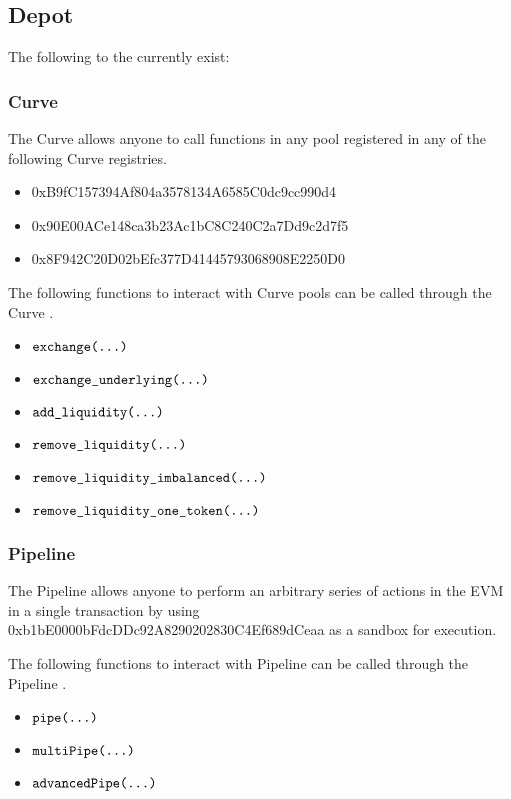 \documentclass[class=article, crop=false]{standalone}
\begin{document}
\subsection{Depot}
The following  to the  currently exist:

\subsubsection{Curve}
The Curve  allows anyone to call functions in any pool registered in any of the following Curve registries.
\begin{itemize}
    \item 0xB9fC157394Af804a3578134A6585C0dc9cc990d4
    \item 0x90E00ACe148ca3b23Ac1bC8C240C2a7Dd9c2d7f5
    \item 0x8F942C20D02bEfc377D41445793068908E2250D0
\end{itemize}

The following functions to interact with Curve pools can be called through the Curve .
\begin{itemize}
    \item $\texttt{exchange(...)}$
    \item $\texttt{exchange\_underlying(...)}$
    \item $\texttt{add\_liquidity(...)}$
    \item $\texttt{remove\_liquidity(...)}$
    \item $\texttt{remove\_liquidity\_imbalanced(...)}$
    \item $\texttt{remove\_liquidity\_one\_token(...)}$
\end{itemize}

\subsubsection{Pipeline}
The Pipeline  allows anyone to perform an arbitrary series of actions in the EVM in a single transaction by using 0xb1bE0000bFdcDDc92A8290202830C4Ef689dCeaa as a sandbox for execution.

The following functions to interact with Pipeline can be called through the Pipeline .
\begin{itemize}
    \item $\texttt{pipe(...)}$
    \item $\texttt{multiPipe(...)}$
    \item $\texttt{advancedPipe(...)}$
\end{itemize}
\end{document}
